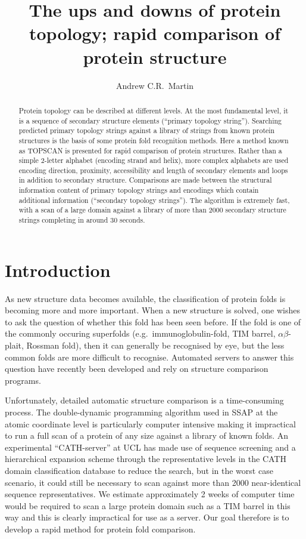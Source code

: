\documentclass{article}
\title{The ups and downs of protein topology; rapid comparison of protein
structure}
\author{Andrew C.R.\ Martin}
\begin{document}
\maketitle

\begin{abstract}
Protein topology can be described at different levels. At the most
fundamental level, it is a sequence of secondary structure elements
(``primary topology string''). Searching predicted primary topology
strings against a library of strings from known protein structures is
the basis of some protein fold recognition methods.  Here a method
known as TOPSCAN is presented for rapid comparison of protein
structures. Rather than a simple 2-letter alphabet (encoding strand
and helix), more complex alphabets are used encoding direction,
proximity, accessibility and length of secondary elements and loops in
addition to secondary structure.  Comparisons are made between the
structural information content of primary topology strings and
encodings which contain additional information (``secondary topology
strings'').  The algorithm is extremely fast, with a scan of a large
domain against a library of more than 2000 secondary structure strings
completing in around 30 seconds.
\end{abstract}

\section{Introduction}
As new structure data becomes available, the classification of protein
folds is becoming more and more important. When a new structure is
solved, one wishes to ask the question of whether this fold has been
seen before. If the fold is one of the commonly occuring superfolds
(e.g.\ immunoglobulin-fold, TIM barrel, $\alpha\beta$-plait, Rossman
fold), then it can generally be recognised by eye, but the less common
folds are more difficult to recognise. Automated servers to answer
this question have recently been developed and rely on structure
comparison programs.

Unfortunately, detailed automatic structure comparison is a
time-consuming process. The double-dynamic programming algorithm used
in SSAP at the atomic coordinate level is particularly computer
intensive making it impractical to run a full scan of a protein of any
size against a library of known folds.  An experimental
``CATH-server'' at UCL has made use of sequence screening and a
hierarchical expansion scheme through the representative levels in the
CATH domain classification database to reduce the search, but in the
worst case scenario, it could still be necessary to scan against more
than 2000 near-identical sequence representatives. We estimate
approximately 2 weeks of computer time would be required to scan a
large protein domain such as a TIM barrel in this way and this is
clearly impractical for use as a server. Our goal therefore is to
develop a rapid method for protein fold comparison.
\end{document}
